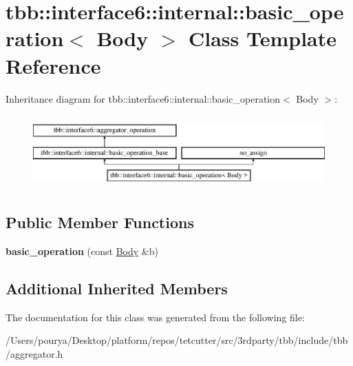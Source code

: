 \hypertarget{classtbb_1_1interface6_1_1internal_1_1basic__operation}{}\section{tbb\+:\+:interface6\+:\+:internal\+:\+:basic\+\_\+operation$<$ Body $>$ Class Template Reference}
\label{classtbb_1_1interface6_1_1internal_1_1basic__operation}
Inheritance diagram for tbb\+:\+:interface6\+:\+:internal\+:\+:basic\+\_\+operation$<$ Body $>$\+:\begin{figure}[H]
\begin{center}
\leavevmode
\includegraphics[height=2.828283cm]{classtbb_1_1interface6_1_1internal_1_1basic__operation}
\end{center}
\end{figure}
\subsection*{Public Member Functions}
\begin{DoxyCompactItemize}
\item 
\hypertarget{classtbb_1_1interface6_1_1internal_1_1basic__operation_adf48b2339f7de2f002c24c8951a03057}{}{\bfseries basic\+\_\+operation} (const \hyperlink{classBody}{Body} \&b)\label{classtbb_1_1interface6_1_1internal_1_1basic__operation_adf48b2339f7de2f002c24c8951a03057}

\end{DoxyCompactItemize}
\subsection*{Additional Inherited Members}


The documentation for this class was generated from the following file\+:\begin{DoxyCompactItemize}
\item 
/\+Users/pourya/\+Desktop/platform/repos/tetcutter/src/3rdparty/tbb/include/tbb/aggregator.\+h\end{DoxyCompactItemize}
